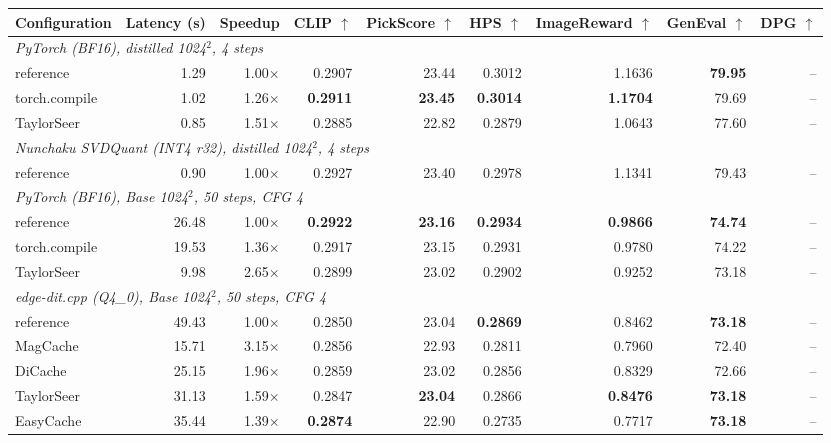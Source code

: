 \begin{table}[t]
\centering
\small
\begin{tabular}{lrrrrrrrr}
\toprule
\textbf{Configuration} & \textbf{Latency (s)} & \textbf{Speedup} & \textbf{CLIP $\uparrow$} & \textbf{PickScore $\uparrow$} & \textbf{HPS $\uparrow$} & \textbf{ImageReward $\uparrow$} & \textbf{GenEval $\uparrow$} & \textbf{DPG $\uparrow$} \\
\midrule
\multicolumn{9}{l}{\textit{PyTorch (BF16), distilled 1024$^2$, 4 steps}} \\
\quad reference & 1.29 & 1.00$\times$ & 0.2907 & 23.44 & 0.3012 & 1.1636 & \textbf{79.95} & – \\
\quad torch.compile & 1.02 & 1.26$\times$ & \textbf{0.2911} & \textbf{23.45} & \textbf{0.3014} & \textbf{1.1704} & 79.69 & – \\
\quad TaylorSeer & 0.85 & 1.51$\times$ & 0.2885 & 22.82 & 0.2879 & 1.0643 & 77.60 & – \\
\midrule
\multicolumn{9}{l}{\textit{Nunchaku SVDQuant (INT4 r32), distilled 1024$^2$, 4 steps}} \\
\quad reference & 0.90 & 1.00$\times$ & 0.2927 & 23.40 & 0.2978 & 1.1341 & 79.43 & – \\
\midrule
\multicolumn{9}{l}{\textit{PyTorch (BF16), Base 1024$^2$, 50 steps, CFG 4}} \\
\quad reference & 26.48 & 1.00$\times$ & \textbf{0.2922} & \textbf{23.16} & \textbf{0.2934} & \textbf{0.9866} & \textbf{74.74} & – \\
\quad torch.compile & 19.53 & 1.36$\times$ & 0.2917 & 23.15 & 0.2931 & 0.9780 & 74.22 & – \\
\quad TaylorSeer & 9.98 & 2.65$\times$ & 0.2899 & 23.02 & 0.2902 & 0.9252 & 73.18 & – \\
\midrule
\multicolumn{9}{l}{\textit{edge-dit.cpp (Q4_0), Base 1024$^2$, 50 steps, CFG 4}} \\
\quad reference & 49.43 & 1.00$\times$ & 0.2850 & 23.04 & \textbf{0.2869} & 0.8462 & \textbf{73.18} & – \\
\quad MagCache & 15.71 & 3.15$\times$ & 0.2856 & 22.93 & 0.2811 & 0.7960 & 72.40 & – \\
\quad DiCache & 25.15 & 1.96$\times$ & 0.2859 & 23.02 & 0.2856 & 0.8329 & 72.66 & – \\
\quad TaylorSeer & 31.13 & 1.59$\times$ & 0.2847 & \textbf{23.04} & 0.2866 & \textbf{0.8476} & \textbf{73.18} & – \\
\quad EasyCache & 35.44 & 1.39$\times$ & \textbf{0.2874} & 22.90 & 0.2735 & 0.7717 & \textbf{73.18} & – \\

\end{tabular}
\end{table}

